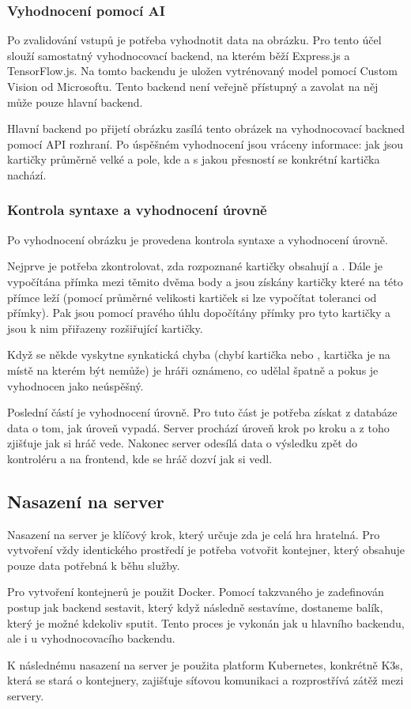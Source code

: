 \subsubsection{Vyhodnocení pomocí AI}
Po zvalidování vstupů je potřeba vyhodnotit data na obrázku. Pro tento účel slouží samostatný vyhodnocovací backend, na kterém běží Express.js a TensorFlow.js. Na tomto backendu je uložen vytrénovaný model pomocí Custom Vision od Microsoftu. Tento backend není veřejně přístupný a zavolat na něj může pouze hlavní backend.\par
Hlavní backend po přijetí obrázku zasílá tento obrázek na vyhodnocovací backned pomocí API rozhraní. Po úspěšném vyhodnocení jsou vráceny informace: jak jsou kartičky průměrně velké a pole, kde a s jakou přesností se konkrétní kartička nachází.

\subsubsection{Kontrola syntaxe a vyhodnocení úrovně}
Po vyhodnocení obrázku je provedena kontrola syntaxe a vyhodnocení úrovně.\par
Nejprve je potřeba zkontrolovat, zda rozpoznané kartičky obsahují  a . Dále je vypočítána přímka mezi těmito dvěma body a jsou získány kartičky které na této přímce leží (pomocí průměrné velikosti kartiček si lze vypočítat toleranci od přímky). Pak jsou pomocí pravého úhlu dopočítány přímky pro tyto kartičky a jsou k nim přiřazeny rozšiřující kartičky.\par
Když se někde vyskytne synkatická chyba (chybí kartička  nebo , kartička je na místě na kterém být nemůže) je hráři oznámeno, co udělal špatně a pokus je vyhodnocen jako neúspěšný.\par
Poslední částí je vyhodnocení úrovně. Pro tuto část je potřeba získat z databáze data o tom, jak úroveň vypadá. Server prochází úroveň krok po kroku a z toho zjišťuje jak si hráč vede. Nakonec server odesílá data o výsledku zpět do kontroléru a na frontend, kde se hráč dozví jak si vedl.

\subsection{Nasazení na server}
Nasazení na server je klíčový krok, který určuje zda je celá hra hratelná. Pro vytvoření vždy identického prostředí je potřeba votvořit kontejner, který obsahuje pouze data potřebná k běhu služby.\par
Pro vytvoření kontejnerů je použit Docker. Pomocí takzvaného  je zadefinován postup jak backend sestavit, který když následně sestavíme, dostaneme balík, který je možné kdekoliv sputit. Tento proces je vykonán jak u hlavního backendu, ale i u vyhodnocovacího backendu.\par
K následnému nasazení na server je použita platform Kubernetes, konkrétně K3s, která se stará o kontejnery, zajišťuje síťovou komunikaci a rozprostřívá zátěž mezi servery.
